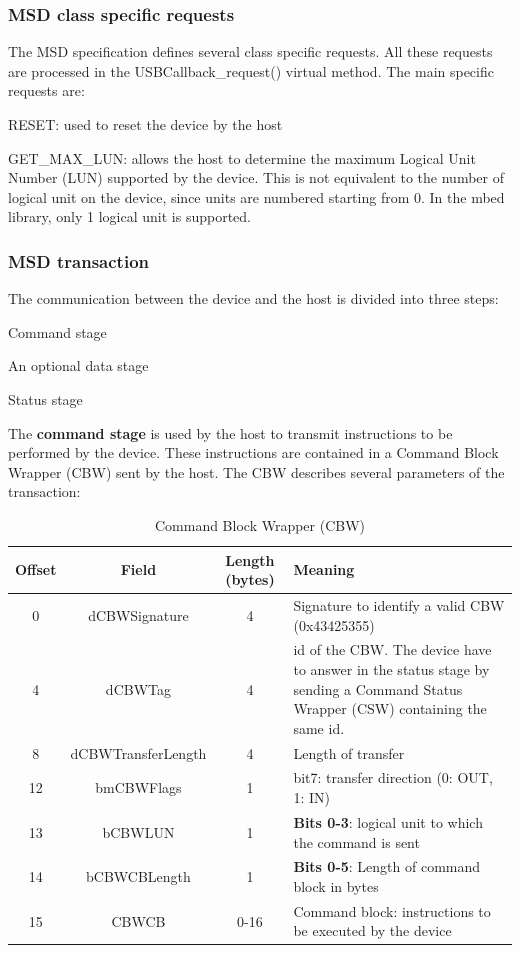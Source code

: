 \documentclass[pdftex,10pt,a4paper]{report}
\newenvironment{packed_item}{
\begin{itemize}
  \setlength{\itemsep}{1pt}
  \setlength{\parskip}{0pt}
  \setlength{\parsep}{0pt}
}{\end{itemize}}
\begin{document}
\subsubsection{MSD class specific requests}
The MSD specification defines several class specific requests. All these requests are processed in the USBCallback\_request() virtual method. The main specific requests are:
\begin{packed_item}
	\item RESET: used to reset the device by the host
	\item GET\_MAX\_LUN: allows the host to determine the maximum Logical Unit Number (LUN) supported by the device. This is not equivalent to the number of logical unit on the device, since units are numbered starting from 0. In the mbed library, only 1 logical unit is supported.
\end{packed_item}

\subsubsection{MSD transaction}
The communication between the device and the host is divided into three steps:
\begin{packed_item}
	\item Command stage
	\item An optional data stage
	\item Status stage
\end{packed_item}

The \textbf{command stage} is used by the host to transmit instructions to be performed by the device. These instructions are contained in a Command Block Wrapper (CBW) sent by the host. The CBW describes several parameters of the transaction:

\begin{table}[h!]
\centering
\begin{tabular}{|c|c|c| >{\arraybackslash}m{9cm} |}
\hline

Offset & Field & Length (bytes) & Meaning \\ \hline
0 & dCBWSignature & 4 & Signature to identify a valid CBW (0x43425355) \\ \hline
4 & dCBWTag & 4 &  id of the CBW. The device have to answer in the status stage by sending a Command Status Wrapper (CSW) containing the same id. \\ \hline
8 & dCBWTransferLength & 4 & Length of transfer \\ \hline
12 & bmCBWFlags & 1 & bit7: transfer direction (0: OUT, 1: IN) \\ \hline
13 & bCBWLUN & 1 & \textbf{Bits 0-3}: logical unit to which the command is sent \\ \hline
14 & bCBWCBLength & 1 & \textbf{Bits 0-5}: Length of command block in bytes \\ \hline
15 & CBWCB & 0-16 & Command block: instructions to be executed by the device \\ \hline

\end{tabular}
\caption{Command Block Wrapper (CBW)}
\label{Command Block Wrapper (CBW)}
\end{table}
\end{document}

